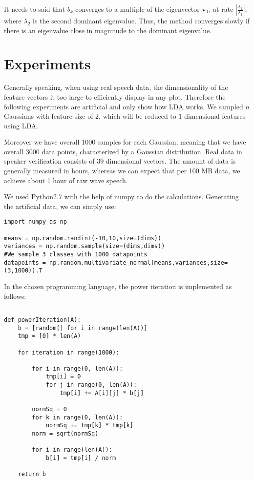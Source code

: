 It needs to said that $b_k$ converges to a multiple of the eigenvector $\mathbf{v}_1$, at rate $ \left| \frac{\lambda_2}{\lambda_1} \right| $, where $\lambda_2$ is the second dominant eigenvalue. Thus, the method converges slowly if there is an eigenvalue close in magnitude to the dominant eigenvalue.

\section{Experiments}

Generally speaking, when using real speech data, the dimensionality of the feature vectors it too large to efficiently display in any plot.
Therefore the following experiments are artificial and only show how LDA works. We sampled $n$ Gaussians with feature size of $2$, which will be reduced to $1$ dimensional features using LDA.

Moreover we have overall $1000$ samples for each Gaussian, meaning that we have overall $3000$ data points, characterized by a Gaussian distribution. 
Real data in speaker verification consists of $39$ dimensional vectors. The amount of data is generally measured in hours, whereas we can expect that per 100 MB data, we achieve about 1 hour of raw wave speech.


We used Python2.7 with the help of numpy to do the calculations. Generating the artificial data, we can simply use:


\begin{verbatim}
import numpy as np

means = np.random.randint(-10,10,size=(dims))
variances = np.random.sample(size=(dims,dims))
#We sample 3 classes with 1000 datapoints
datapoints = np.random.multivariate_normal(means,variances,size=(3,1000)).T
\end{verbatim}

In the chosen programming language, the power iteration is implemented as follows:

\begin{verbatim}
               
def powerIteration(A):
    b = [random() for i in range(len(A))]
    tmp = [0] * len(A)

    for iteration in range(1000):

        for i in range(0, len(A)):
            tmp[i] = 0
            for j in range(0, len(A)):
                tmp[i] += A[i][j] * b[j]

        normSq = 0
        for k in range(0, len(A)):
            normSq += tmp[k] * tmp[k]
        norm = sqrt(normSq)

        for i in range(len(A)):
            b[i] = tmp[i] / norm

    return b
\end{verbatim}


